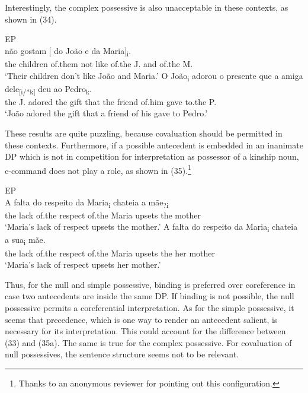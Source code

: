 \documentclass[output=paper]{langsci/langscibook}
\begin{document}
Interestingly, the complex possessive is also unacceptable in these contexts, as shown in (34).

\ea%
         EP\label{ex:wein:34}\\
    \ea  
    \gll {} não gostam [ do João e da Maria]\textsubscript{i}.\\
         {} the children of.them not like {} of.the J. and of.the M.\\
    \glt ‘Their children don’t like João and Maria.’
    \ex  
    \gll O João\textsubscript{i} adorou o presente que a amiga dele\textsubscript{[i/*k]} deu ao Pedro\textsubscript{k}.\\
         the J. adored the gift that the friend of.him gave to.the P.\\
    \glt ‘João adored the gift that a friend of his gave to Pedro.’
    \z
\z

These results are quite puzzling, because covaluation should be permitted in these contexts. Furthermore, if a possible antecedent is embedded in an inanimate DP which is not in competition for interpretation as possessor of a kinship noun, c-command does not play a role, as shown in (35).\footnote{Thanks to an anonymous reviewer for pointing out this configuration.}

\ea%
         EP\label{ex:wein:35}\\
    \ea            
    \gll A falta do respeito da Maria\textsubscript{i} chateia a mãe\textsubscript{?i}\\
         the lack of.the respect of.the Maria upsets the mother\\
    \glt ‘Maria’s lack of respect upsets the mother.’
    \ex  
    \gll A falta do respeito da Maria\textsubscript{i} chateia a sua\textsubscript{i} mãe.\\
         the lack of.the respect of.the Maria upsets the her mother\\
    \glt ‘Maria’s lack of respect upsets her mother.’
    \z
\z

Thus, for the null and simple possessive, binding is preferred over coreference in case two antecedents are inside the same DP. If binding is not possible, the null possessive permits a coreferential interpretation. As for the simple possessive, it seems that precedence, which is one way to render an antecedent salient, is necessary for its interpretation. This could account for the difference between (33) and (35a). The same is true for the complex possessive. For covaluation of null possessives, the sentence structure seems not to be relevant.
\end{document}
